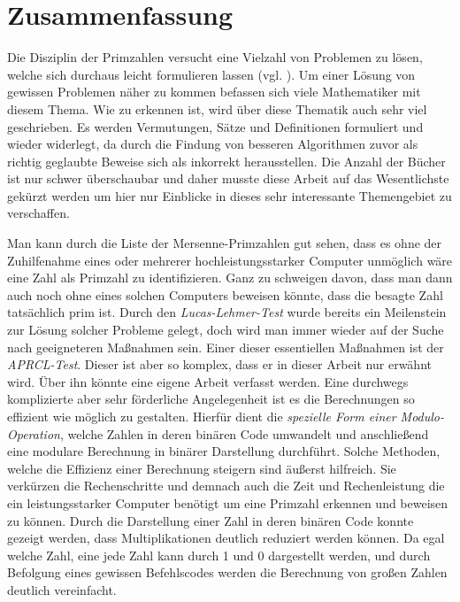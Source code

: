 \documentclass[12pt,a4paper]{article}
\theoremstyle{definition}
\begin{document}
\newpage
\section{Zusammenfassung}
Die Disziplin der Primzahlen versucht eine Vielzahl von Problemen zu lösen, welche sich durchaus leicht formulieren lassen (vgl. \cite[13]{Pomerance1996}).
Um einer Lösung von gewissen Problemen näher zu kommen befassen sich viele Mathematiker mit diesem Thema.
Wie zu erkennen ist, wird über diese Thematik auch sehr viel geschrieben.
Es werden Vermutungen, Sätze und Definitionen formuliert und wieder widerlegt, da durch die Findung von besseren Algorithmen zuvor als richtig geglaubte Beweise sich als inkorrekt herausstellen.
Die Anzahl der Bücher ist nur schwer überschaubar und daher musste diese Arbeit auf das Wesentlichste gekürzt werden um hier nur Einblicke in dieses sehr interessante Themengebiet zu verschaffen.

Man kann durch die Liste der Mersenne-Primzahlen gut sehen, dass es ohne der Zuhilfenahme eines oder mehrerer hochleistungsstarker Computer unmöglich wäre eine Zahl als Primzahl zu identifizieren.
Ganz zu schweigen davon, dass man dann auch noch ohne eines solchen Computers beweisen könnte, dass die besagte Zahl tatsächlich prim ist.
Durch den \textit{Lucas-Lehmer-Test} wurde bereits ein Meilenstein zur Lösung solcher Probleme gelegt, doch wird man immer wieder auf der Suche nach geeigneteren Maßnahmen sein.
Einer dieser essentiellen Maßnahmen ist der \textit{APRCL-Test}.
Dieser ist aber so komplex, dass er in dieser Arbeit nur erwähnt wird.
Über ihn könnte eine eigene Arbeit verfasst werden.
Eine durchwegs komplizierte aber sehr förderliche Angelegenheit ist es die Berechnungen so effizient wie möglich zu gestalten.
Hierfür dient die \textit{spezielle Form einer Modulo-Operation}, welche Zahlen in deren binären Code umwandelt und anschließend eine modulare Berechnung in binärer Darstellung durchführt.
Solche Methoden, welche die Effizienz einer Berechnung steigern sind äußerst hilfreich.
Sie verkürzen die Rechenschritte und demnach auch die Zeit und Rechenleistung die ein leistungsstarker Computer benötigt um eine Primzahl erkennen und beweisen zu können.
Durch die Darstellung einer Zahl in deren binären Code konnte gezeigt werden, dass Multiplikationen deutlich reduziert werden können.
Da egal welche Zahl, eine jede Zahl kann durch 1 und 0 dargestellt werden, und durch Befolgung eines gewissen Befehlscodes werden die Berechnung von großen Zahlen deutlich vereinfacht.
\end{document}
